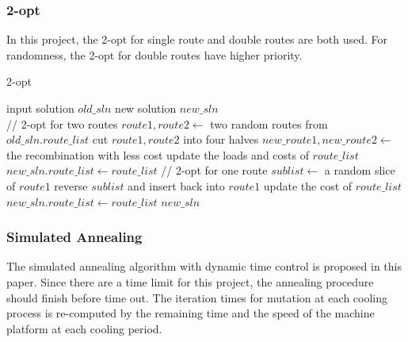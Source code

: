 \documentclass[9pt,shortpaper,twoside,web]{ieeecolor}
\begin{document}
\subsubsection{2-opt} 
In this project, the 2-opt for single route and double routes are both used. For randomness, the 2-opt for double routes have higher priority.

\begin{algorithm}
 \caption{2-opt}
 \begin{algorithmic}[h]
 \renewcommand{\algorithmicrequire}{\textbf{Input:}}
 \renewcommand{\algorithmicensure}{\textbf{Output:}}
 \REQUIRE input solution $old\_sln$ 
 \ENSURE  new solution $new\_sln$\\ 
 \STATE // 2-opt for two routes
 \STATE $route1, route2\gets$ two random routes from $old\_sln.route\_list$
 \STATE cut $route1, route2$ into four halves
 \STATE $new\_route1, new\_route2\gets$ the recombination with less cost
 \STATE update the loads and costs of $route\_list$ 
 \STATE $new\_sln.route\_list\gets route\_list$ 
 \ELSE
 \STATE // 2-opt for one route
 \STATE $sublist\gets$ a random slice of $route1$
 \STATE reverse $sublist$ and insert back into $route1$
 \STATE update the cost of $route\_list$
 \STATE $new\_sln.route\_list\gets route\_list$ 
 \ENDIF
 \RETURN $new\_sln$
 \end{algorithmic} 
 \end{algorithm}

\subsubsection{Simulated Annealing} 
The simulated annealing algorithm with dynamic time control is proposed in this paper. Since there are a time limit for this project, the annealing procedure should finish before time out. The iteration times for mutation at each cooling process is re-computed by the remaining time and the speed of the machine platform at each cooling period.
\end{document}
